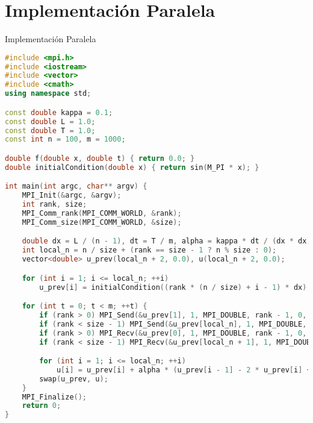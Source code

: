 \documentclass{beamer}
\begin{document}
\section{Implementación Paralela}
\begin{frame}[fragile]{Implementación Paralela}
\begin{lstlisting}[language=C++, caption=Código en C++ para la implementación paralela]
#include <mpi.h>
#include <iostream>
#include <vector>
#include <cmath>
using namespace std;

const double kappa = 0.1;
const double L = 1.0;
const double T = 1.0;
const int n = 100, m = 1000;

double f(double x, double t) { return 0.0; }
double initialCondition(double x) { return sin(M_PI * x); }

int main(int argc, char** argv) {
    MPI_Init(&argc, &argv);
    int rank, size;
    MPI_Comm_rank(MPI_COMM_WORLD, &rank);
    MPI_Comm_size(MPI_COMM_WORLD, &size);

    double dx = L / (n - 1), dt = T / m, alpha = kappa * dt / (dx * dx);
    int local_n = n / size + (rank == size - 1 ? n % size : 0);
    vector<double> u_prev(local_n + 2, 0.0), u(local_n + 2, 0.0);

    for (int i = 1; i <= local_n; ++i)
        u_prev[i] = initialCondition((rank * (n / size) + i - 1) * dx);

    for (int t = 0; t < m; ++t) {
        if (rank > 0) MPI_Send(&u_prev[1], 1, MPI_DOUBLE, rank - 1, 0, MPI_COMM_WORLD);
        if (rank < size - 1) MPI_Send(&u_prev[local_n], 1, MPI_DOUBLE, rank + 1, 0, MPI_COMM_WORLD);
        if (rank > 0) MPI_Recv(&u_prev[0], 1, MPI_DOUBLE, rank - 1, 0, MPI_COMM_WORLD, MPI_STATUS_IGNORE);
        if (rank < size - 1) MPI_Recv(&u_prev[local_n + 1], 1, MPI_DOUBLE, rank + 1, 0, MPI_COMM_WORLD, MPI_STATUS_IGNORE);

        for (int i = 1; i <= local_n; ++i)
            u[i] = u_prev[i] + alpha * (u_prev[i - 1] - 2 * u_prev[i] + u_prev[i + 1]) + dt * f((rank * (n / size) + i - 1) * dx, t * dt);
        swap(u_prev, u);
    }
    MPI_Finalize();
    return 0;
}
\end{lstlisting}
\end{frame}
\end{document}
